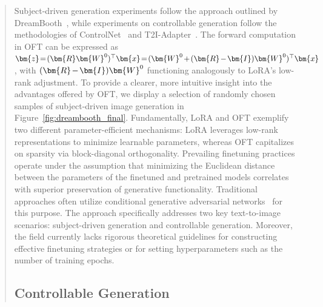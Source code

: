 \begin{abstract}
\begin{itemize}[leftmargin=*,nosep]
Subject-driven generation experiments follow the approach outlined by DreamBooth~\cite{ruiz2023dreambooth}, while experiments on controllable generation follow the methodologies of ControlNet~\cite{zhang2023adding} and T2I-Adapter~\cite{mou2023t2i}. The forward computation in OFT can be expressed as $\thickmuskip=2mu \medmuskip=2mu \bm{z}=(\bm{R}\bm{W}^0)^\top\bm{x}=(\bm{W}^0+(\bm{R}-\bm{I})\bm{W}^0)^\top\bm{x}$, with $\thickmuskip=2mu \medmuskip=2mu (\bm{R}-\bm{I})\bm{W}^0$ functioning analogously to LoRA’s low-rank adjustment. To provide a clearer, more intuitive insight into the advantages offered by OFT, we display a selection of randomly chosen samples of subject-driven image generation in Figure~\ref{fig:dreambooth_final}. Fundamentally, LoRA and OFT exemplify two different parameter-efficient mechanisms: LoRA leverages low-rank representations to minimize learnable parameters, whereas OFT capitalizes on sparsity via block-diagonal orthogonality. Prevailing finetuning practices operate under the assumption that minimizing the Euclidean distance between the parameters of the finetuned and pretrained models correlates with superior preservation of generative functionality. Traditional approaches often utilize conditional generative adversarial networks~\cite{isola2017image,zhu2017toward,wang2018high,park2019semantic,choi2018stargan} for this purpose. The approach specifically addresses two key text-to-image scenarios: subject-driven generation and controllable generation. Moreover, the field currently lacks rigorous theoretical guidelines for constructing effective finetuning strategies or for setting hyperparameters such as the number of training epochs. \subsection{Controllable Generation}


\end{itemize}
\end{abstract}

